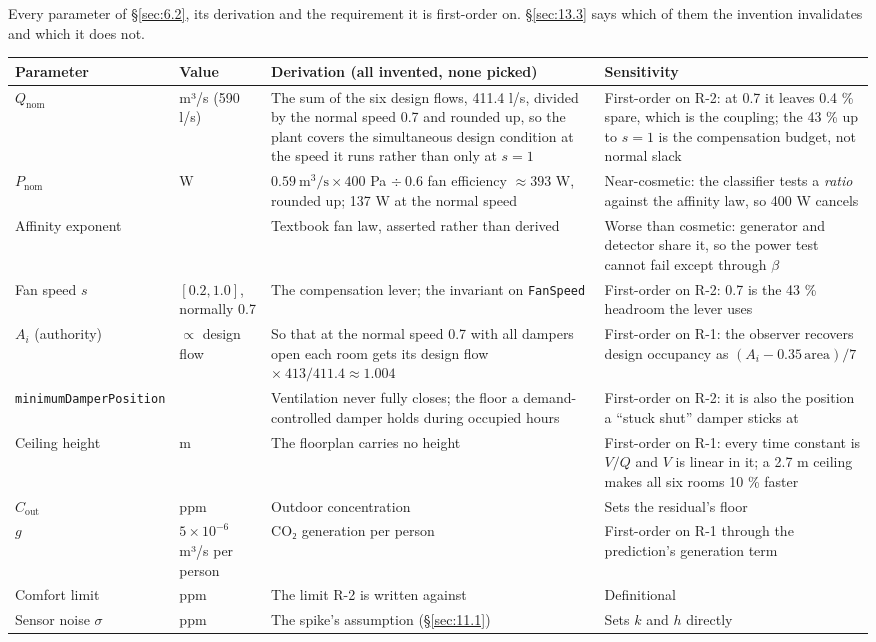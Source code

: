 Every parameter of \S\ref{sec:6.2}, its derivation and the requirement it is first-order on. \S\ref{sec:13.3} says
which of them the invention invalidates and which it does not.

\begin{longtable}[]{@{}
  >{\raggedright\arraybackslash}p{}
  >{\raggedright\arraybackslash}p{}
  >{\raggedright\arraybackslash}p{}
  >{\raggedright\arraybackslash}p{}@{}}
\toprule
\textbf{Parameter} & \textbf{Value} & \textbf{Derivation (all invented, none picked)} &
\textbf{Sensitivity} \\
\midrule
\endhead
$Q_\text{nom}$ & 0.59 m³/s (590 l/s) & The sum of the six design flows, 411.4 l/s, divided by the
normal speed 0.7 and rounded up, so the plant covers the simultaneous design condition at the speed
it runs rather than only at $s=1$ &
First-order on R-2: at 0.7 it leaves 0.4 \% spare, which is the coupling; the 43 \% up to $s=1$ is
the compensation budget, not normal slack \\
$P_\text{nom}$ & 400 W & $0.59\ \text{m}^3/\text{s} \times 400$ Pa $\div\ 0.6$ fan efficiency
$\approx 393$ W, rounded up; 137 W at the normal speed & Near-cosmetic: the classifier tests a
\emph{ratio} against the affinity law, so 400 W cancels \\
Affinity exponent & 3 & Textbook fan law, asserted rather than derived & Worse than cosmetic:
generator and detector share it, so the power test cannot fail except through $\beta$ \\
Fan speed $s$ & $[0.2, 1.0]$, normally 0.7 & The compensation lever; the invariant on
\texttt{FanSpeed} & First-order on R-2: 0.7 is the 43 \% headroom the lever uses \\
$A_i$ (authority) & $\propto$ design flow & So that at the normal speed 0.7 with all dampers open
each room gets its design flow $\times\ 413/411.4 \approx 1.004$ & First-order on R-1: the observer
recovers design occupancy as $(A_i - 0.35\,\text{area})/7$ \\
\texttt{minimumDamperPosition} & 0.15 & Ventilation never fully closes; the floor a
demand-controlled damper holds during occupied hours & First-order on R-2: it is also the position
a ``stuck shut'' damper sticks at \\
Ceiling height & 3.0 m & The floorplan carries no height & First-order on R-1: every time constant
is $V/Q$ and $V$ is linear in it; a 2.7 m ceiling makes all six rooms 10 \% faster \\
$C_\text{out}$ & 420 ppm & Outdoor concentration & Sets the residual's floor \\
$g$ & $5\times10^{-6}$ m³/s per person & CO₂ generation per person & First-order on R-1 through
the prediction's generation term \\
Comfort limit & 1000 ppm & The limit R-2 is written against & Definitional \\
Sensor noise $\sigma$ & 30 ppm & The spike's assumption (§\ref{sec:11.1}) & Sets $k$ and $h$ directly \\
\bottomrule
\end{longtable}

